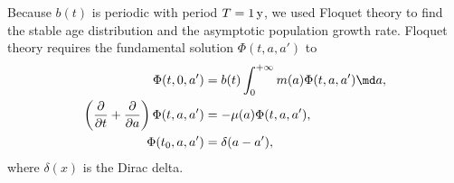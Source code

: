 \documentclass{jpmarticle}
\begin{document}
Because $b(t)$ is periodic with period $T = \unit[1]{y}$, we used
Floquet theory \autocite{parker_1992} to find the stable age
distribution and the asymptotic population growth rate. Floquet theory
requires the fundamental solution $\Phi(t, a, a')$ to
\begin{equation}
  \begin{split}
    \Phi(t, 0, a')
    &= b(t) \int_0^{+\infty} m(a) \Phi(t, a, a') \md a,
    \\
    \left(\frac{\partial}{\partial t}
      + \frac{\partial}{\partial a}\right)
    \Phi(t, a, a')
    &= - \mu(a) \Phi(t, a, a'),
    \\
    \Phi(t_0, a, a')
    &= \delta(a - a'),
  \end{split}
\end{equation}
where $\delta(x)$ is the Dirac delta.
\end{document}
